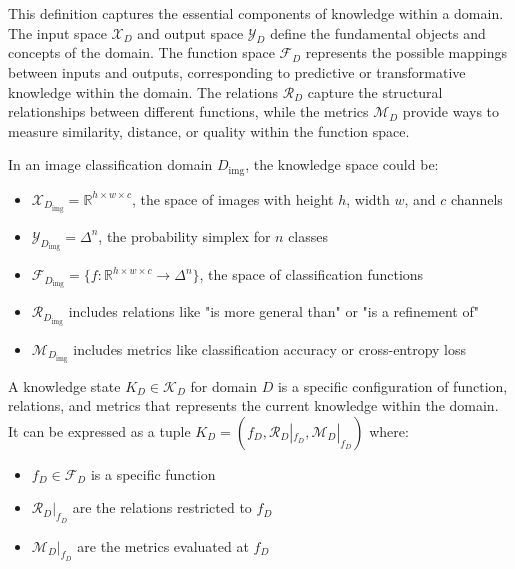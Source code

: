 This definition captures the essential components of knowledge within a domain. The input space $\mathcal{X}_D$ and output space $\mathcal{Y}_D$ define the fundamental objects and concepts of the domain. The function space $\mathcal{F}_D$ represents the possible mappings between inputs and outputs, corresponding to predictive or transformative knowledge within the domain. The relations $\mathcal{R}_D$ capture the structural relationships between different functions, while the metrics $\mathcal{M}_D$ provide ways to measure similarity, distance, or quality within the function space.

\begin{example}
In an image classification domain $D_{\text{img}}$, the knowledge space could be:
\begin{itemize}
    \item $\mathcal{X}_{D_{\text{img}}} = \mathbb{R}^{h \times w \times c}$, the space of images with height $h$, width $w$, and $c$ channels
    \item $\mathcal{Y}_{D_{\text{img}}} = \Delta^n$, the probability simplex for $n$ classes
    \item $\mathcal{F}_{D_{\text{img}}} = \{f: \mathbb{R}^{h \times w \times c} \to \Delta^n\}$, the space of classification functions
    \item $\mathcal{R}_{D_{\text{img}}}$ includes relations like "is more general than" or "is a refinement of"
    \item $\mathcal{M}_{D_{\text{img}}}$ includes metrics like classification accuracy or cross-entropy loss
\end{itemize}
\end{example}

\begin{definition}
A knowledge state $K_D \in \mathcal{K}_D$ for domain $D$ is a specific configuration of function, relations, and metrics that represents the current knowledge within the domain. It can be expressed as a tuple $K_D = (f_D, \mathcal{R}_D|_{f_D}, \mathcal{M}_D|_{f_D})$ where:
\begin{itemize}
    \item $f_D \in \mathcal{F}_D$ is a specific function
    \item $\mathcal{R}_D|_{f_D}$ are the relations restricted to $f_D$
    \item $\mathcal{M}_D|_{f_D}$ are the metrics evaluated at $f_D$
\end{itemize}
\end{definition}

